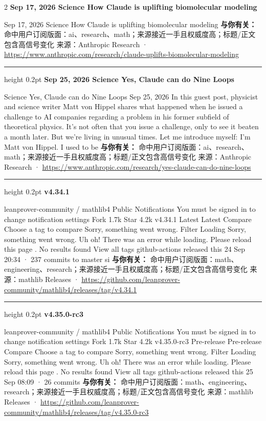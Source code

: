 \documentclass[10.5pt]{ctexart}
\begin{document}
\begin{multicols}{2}
{\large\bfseries Sep 17, 2026 Science How Claude is uplifting biomolecular modeling}\par
Sep 17, 2026 Science How Claude is uplifting biomolecular modeling
\textbf{与你有关：} 命中用户订阅版面：ai、research、math；来源接近一手且权威度高；标题/正文包含高信号变化
{\footnotesize\color{ormuted} 来源：Anthropic Research · \url{https://www.anthropic.com/research/claude-uplifts-biomolecular-modeling}}
\vspace{2mm}
\hrule height 0.2pt
\vspace{2mm}
{\large\bfseries Sep 25, 2026 Science Yes, Claude can do Nine Loops}\par
Science Yes, Claude can do Nine Loops Sep 25, 2026 In this guest post, physicist and science writer Matt von Hippel shares what happened when he issued a challenge to AI companies regarding a problem in his former subfield of theoretical physics. It’s not often that you issue a challenge, only to see it beaten a month later. But we’re living in unusual times. Let me introduce myself: I’m Matt von Hippel. I used to be
\textbf{与你有关：} 命中用户订阅版面：ai、research、math；来源接近一手且权威度高；标题/正文包含高信号变化
{\footnotesize\color{ormuted} 来源：Anthropic Research · \url{https://www.anthropic.com/research/yes-claude-can-do-nine-loops}}
\vspace{2mm}
\hrule height 0.2pt
\vspace{2mm}
{\large\bfseries v4.34.1}\par
leanprover-community / mathlib4 Public Notifications You must be signed in to change notification settings Fork 1.7k Star 4.2k v4.34.1 Latest Latest Compare Choose a tag to compare Sorry, something went wrong. Filter Loading Sorry, something went wrong. Uh oh! There was an error while loading. Please reload this page . No results found View all tags github-actions released this 24 Sep 20:34 · 237 commits to master si
\textbf{与你有关：} 命中用户订阅版面：math、engineering、research；来源接近一手且权威度高；标题/正文包含高信号变化
{\footnotesize\color{ormuted} 来源：mathlib Releases · \url{https://github.com/leanprover-community/mathlib4/releases/tag/v4.34.1}}
\vspace{2mm}
\hrule height 0.2pt
\vspace{2mm}
{\large\bfseries v4.35.0-rc3}\par
leanprover-community / mathlib4 Public Notifications You must be signed in to change notification settings Fork 1.7k Star 4.2k v4.35.0-rc3 Pre-release Pre-release Compare Choose a tag to compare Sorry, something went wrong. Filter Loading Sorry, something went wrong. Uh oh! There was an error while loading. Please reload this page . No results found View all tags github-actions released this 25 Sep 08:09 · 26 commits
\textbf{与你有关：} 命中用户订阅版面：math、engineering、research；来源接近一手且权威度高；标题/正文包含高信号变化
{\footnotesize\color{ormuted} 来源：mathlib Releases · \url{https://github.com/leanprover-community/mathlib4/releases/tag/v4.35.0-rc3}}
\end{multicols}
\end{document}
